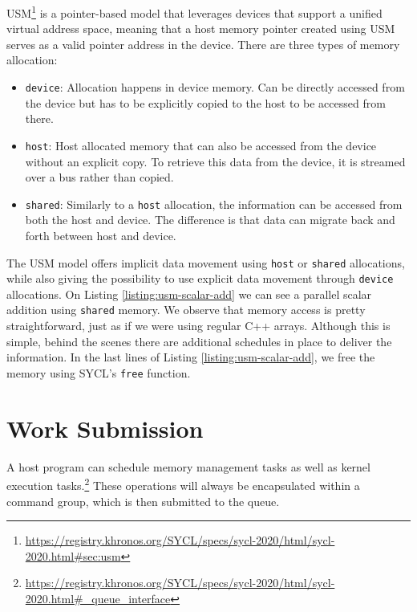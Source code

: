 USM\footnote{\url{https://registry.khronos.org/SYCL/specs/sycl-2020/html/sycl-2020.html\#sec:usm}} is a pointer-based model that leverages devices that support a unified virtual address space, meaning that a host memory pointer created using USM serves as a valid pointer address in the device.
There are three types of memory allocation:
\begin{itemize}
    \item \texttt{device}: Allocation happens in device memory.
    Can be directly accessed from the device but has to be explicitly copied to the host to be accessed from there.
    \item \texttt{host}: Host allocated memory that can also be accessed from the device without an explicit copy.
    To retrieve this data from the device, it is streamed over a bus rather than copied.
    \item \texttt{shared}: Similarly to a \texttt{host} allocation, the information can be accessed from both the host and device.
    The difference is that data can migrate back and forth between host and device.
\end{itemize}
\pagebreak


The USM model offers implicit data movement using \texttt{host} or \texttt{shared} allocations, while also giving the possibility to use explicit data movement through \texttt{device} allocations.
On Listing \ref{listing:usm-scalar-add} we can see a parallel scalar addition using \texttt{shared} memory.
We observe that memory access is pretty straightforward, just as if we were using regular C++ arrays.
Although this is simple, behind the scenes there are additional schedules in place to deliver the information.
In the last lines of Listing \ref{listing:usm-scalar-add}, we free the memory using SYCL's \texttt{free} function.

\section{Work Submission}

A host program can schedule memory management tasks as well as kernel execution tasks.\footnote{\url{https://registry.khronos.org/SYCL/specs/sycl-2020/html/sycl-2020.html\#\_queue\_interface}}
These operations will always be encapsulated within a command group, which is then submitted to the queue.

